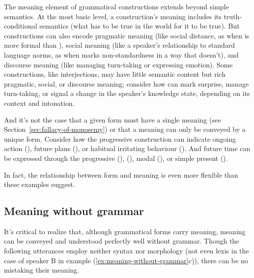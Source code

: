 The meaning element of grammatical constructions extends beyond simple semantics. At the most basic level, a construction's meaning includes its truth-conditional semantics (what has to be true in the world for it to be true). But constructions can also encode pragmatic meaning (like social distance, as when  is more formal than ), social meaning (like a speaker's relationship to standard language norms, as when  marks non-standardness in a way that  doesn't), and discourse meaning (like managing turn-taking or expressing emotion). Some constructions, like interjections, may have little semantic content but rich pragmatic, social, or discourse meaning; consider how  can mark surprise, manage turn-taking, or signal a change in the speaker's knowledge state, depending on its context and intonation.

And it's not the case that a given form must have a single meaning (see Section~\ref{sec:fallacy-of-monosemy}) or that a meaning can only be conveyed by a unique form. Consider how the progressive construction can indicate ongoing action (), future plans (), or habitual irritating behaviour (). And future time can be expressed through the progressive (),  (), modal  (), or simple present ().

In fact, the relationship between form and meaning is even more flexible than these examples suggest.

\subsection*{Meaning without grammar}

It's critical to realize that, although grammatical forms carry meaning, meaning can be conveyed and understood perfectly well without grammar. Though the following utterances employ neither syntax nor morphology (not even lexis in the case of speaker B in example (\ref{ex:meaning-without-grammar}c)), there can be no mistaking their meaning.

